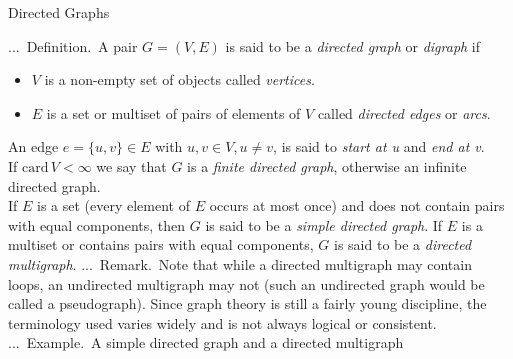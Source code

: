 \documentclass[smaller,hyperref={CJKbookmarks=true}]{beamer}
\newcounter{zhuo}[subsection]
\renewcommand{\thezhuo}{\thesection.\thesubsection.\arabic{zhuo}}
\newenvironment{DEFINITION}{\stepcounter{zhuo}\alert{\thezhuo.~Definition.\,}}{}
\newenvironment{REMARK}{\stepcounter{zhuo}\alert{\thezhuo.~Remark.\,}}{}
\newenvironment{EXAMPLE}{\stepcounter{zhuo}\alert{\!\thezhuo.~Example.\,}}{}
\begin{document}
\begin{frame}{Directed Graphs}
\begin{spacing}{1.1}
\begin{DEFINITION}
A pair $G=(V,E)$ is said to be a \emph{directed graph} or \emph{digraph} if
\begin{itemize}
  \item $V$ is a non-empty set of objects called \emph{vertices}.
  \item $E$ is a set or multiset of pairs of elements of $V$ called \emph{directed edges} or \emph{arcs}.
\end{itemize}
An edge $e=\{u,v\}\in E$ with $u,v\in V,u\neq v$, is said to \emph{start at u} and \emph{end at v}.\\[5pt]
If $\text{card}\,V<\infty$ we say that $G$ is a \emph{finite directed graph}, otherwise an infinite directed graph.\\[5pt]
If $E$ is a set (every element of $E$ occurs at most once) and does not contain
pairs with equal components, then $G$ is said to be a \emph{simple directed graph}.
If $E$ is a multiset or contains pairs with equal components, $G$ is said to be
a \emph{directed multigraph}.
\end{DEFINITION}
\newpage
\begin{REMARK}
Note that while a directed multigraph may contain loops,
an undirected multigraph may not (such an undirected graph would be
called a pseudograph). Since graph theory is still a fairly young discipline,
the terminology used varies widely and is not always logical or consistent.\\[7pt]
\end{REMARK}
\begin{EXAMPLE}
A simple directed graph and a directed multigraph\\[8pt]
\end{EXAMPLE}
\begin{center}
\qquad\qquad\qquad
{}
\end{center}
\end{spacing}
\end{frame}
\end{document}
